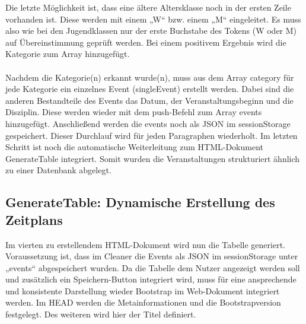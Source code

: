 {Die letzte Möglichkeit ist, dass eine ältere Altersklasse noch in der ersten Zeile vorhanden ist. Diese werden mit einem „W“ bzw. einem „M“ eingeleitet. Es muss also wie bei den Jugendklassen nur der erste Buchstabe des Tokens (W oder M) auf Übereinstimmung geprüft werden. Bei einem positivem Ergebnis wird die Kategorie zum Array hinzugefügt.\\
\\
Nachdem die Kategorie(n) erkannt wurde(n), muss aus dem Array category für jede Kategorie ein einzelnes Event (singleEvent) erstellt werden. Dabei sind die anderen Bestandteile des Events das Datum, der Veranstaltungsbeginn und die Disziplin. Diese werden wieder mit dem push-Befehl zum Array events hinzugefügt. Anschließend werden die events noch als JSON im sessionStorage gespeichert. 
Dieser Durchlauf wird für jeden Paragraphen wiederholt.
Im letzten Schritt ist noch die automatische Weiterleitung zum HTML-Dokument GenerateTable integriert. Somit wurden die Veranstaltungen strukturiert ähnlich zu einer Datenbank abgelegt.

\subsection{GenerateTable: Dynamische Erstellung des Zeitplans}

Im vierten zu erstellendem HTML-Dokument wird nun die Tabelle generiert. Voraussetzung ist, dass im Cleaner die Events als JSON im sessionStorage unter „events“ abgespeichert wurden.
Da die Tabelle dem Nutzer angezeigt werden soll und zusätzlich ein Speichern-Button integriert wird, muss für eine ansprechende und konsistente Darstellung wieder Bootstrap im Web-Dokument integriert werden.
Im HEAD werden die Metainformationen und die Bootstrapversion festgelegt. Des weiteren wird hier der Titel definiert. 

}
